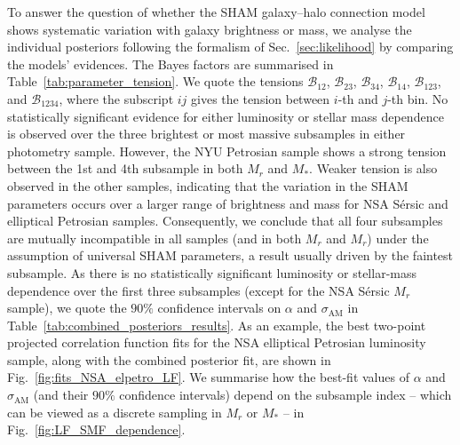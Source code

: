 \documentclass[usenatbib,useAMS]{mnras}
\newcommand{\scatter}{\ensuremath{\sigma_{\mathrm{AM}}}}
\begin{document}
To answer the question of whether the \ac{SHAM} galaxy--halo connection model shows systematic variation with galaxy brightness or mass, we analyse the individual posteriors following the formalism of Sec.~\ref{sec:likelihood} by comparing the models' evidences. The Bayes factors are summarised in Table~\ref{tab:parameter_tension}. We quote the tensions $\mathcal{B}_{12}$, $\mathcal{B}_{23}$, $\mathcal{B}_{34}$, $\mathcal{B}_{14}$, $\mathcal{B}_{123}$, and $\mathcal{B}_{1234}$, where the subscript $ij$ gives the tension between $i$-th and $j$-th bin. No statistically significant evidence for either luminosity or stellar mass dependence is observed over the three brightest or most massive subsamples in either photometry sample. However, the \ac{NYU} Petrosian sample shows a strong tension between the 1st and 4th subsample in both $M_r$ and $M_*$. Weaker tension is also observed in the other samples, indicating that the variation in the \ac{SHAM} parameters occurs over a larger range of brightness and mass for \ac{NSA} S\'ersic and elliptical Petrosian samples. Consequently, we conclude that all four subsamples are mutually incompatible in all samples (and in both $M_r$ and $M_r$) under the assumption of universal SHAM parameters, a result usually driven by the faintest subsample. As there is no statistically significant luminosity or stellar-mass dependence over the first three subsamples (except for the \ac{NSA} S\'ersic $M_r$ sample), we quote the $90\%$ confidence intervals on $\alpha$ and $\scatter$ in Table~\ref{tab:combined_posteriors_results}. As an example, the best two-point projected correlation function fits for the \ac{NSA} elliptical Petrosian luminosity sample, along with the combined posterior fit, are shown in Fig.~\ref{fig:fits_NSA_elpetro_LF}. We summarise how the best-fit values of $\alpha$ and $\scatter$ (and their $90\%$ confidence intervals) depend on the subsample index -- which can be viewed as a discrete sampling in $M_r$ or $M_*$ -- in Fig.~\ref{fig:LF_SMF_dependence}.
\end{document}
